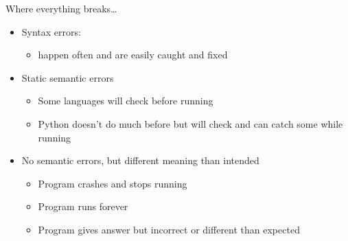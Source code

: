 \documentclass[pdf, aspectratio=169, 12pt]{beamer}
\begin{document}
\begin{frame}{Where everything breaks\ldots}
	\begin{itemize}
		\item Syntax errors:
			\begin{itemize}
				\item happen often and are easily caught and fixed
			\end{itemize}
		\item Static semantic errors
			\begin{itemize}
				\item Some languages will check before running
				\item Python doesn't do much before but will check and can catch some while running
			\end{itemize}
		\item No semantic errors, but different meaning than intended
			\begin{itemize}
				\item Program crashes and stops running
				\item Program runs forever
				\item Program gives answer but incorrect or different than expected
			\end{itemize}
	\end{itemize}
\end{frame}
\end{document}
